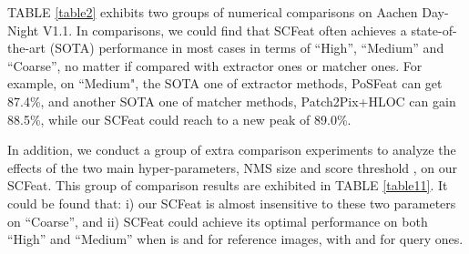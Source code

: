 \documentclass[journal]{IEEEtran}
\begin{document}
TABLE \ref{table2} exhibits two groups of numerical comparisons on Aachen Day-Night V1.1.
In comparisons, we could find that SCFeat often achieves a state-of-the-art (SOTA) performance in most cases in terms of ``High'', ``Medium'' and ``Coarse'', no matter if compared with extractor ones or matcher ones. For example, on ``Medium", the SOTA one of extractor methods, PoSFeat can get 87.4\%, and another SOTA one of matcher methods, Patch2Pix+HLOC can gain 88.5\%, while our SCFeat could reach to a new peak of 89.0\%.



\begin{table}[h]
\centering
\caption{Impact of Hyper-parameters: the evaluation comparisons on Aachen Day-Night v1.1 for visual localization, with maximal interest point number . ``High", ``Medium" and ``Coarse" present , , and , respectively. 
}
\renewcommand\arraystretch{1.2}
\label{table11}
\end{table}

In addition, we conduct a group of extra comparison experiments to analyze the effects of the two main hyper-parameters, NMS size  and score threshold , on our SCFeat.
This group of comparison results are exhibited in TABLE \ref{table11}. It could be found that: i) our SCFeat is almost insensitive to these two parameters on ``Coarse'', and ii) SCFeat could achieve its optimal performance on both ``High'' and ``Medium'' when  is  and  for reference images, with  and  for query ones. 
\end{document}
